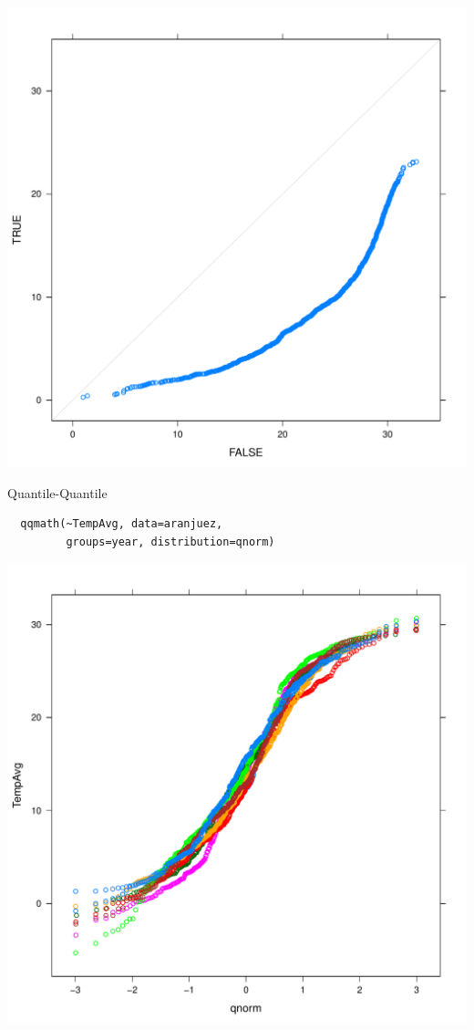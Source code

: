\documentclass[xcolor={usenames,svgnames,dvipsnames}]{beamer}
\begin{document}
\begin{frame}[label=sec-2-1-53]{}
\includegraphics[width=.9\linewidth]{figs/qqWinter.pdf}
\end{frame}

\begin{frame}[fragile,label=sec-2-1-54]{Quantile-Quantile}
 \lstset{language=R,label= ,caption= ,numbers=none}
\begin{lstlisting}
  qqmath(~TempAvg, data=aranjuez,
         groups=year, distribution=qnorm)
\end{lstlisting}
\end{frame}

\begin{frame}[label=sec-2-1-55]{}
\includegraphics[width=.9\linewidth]{figs/qqNorm.pdf}
\end{frame}
\end{document}
